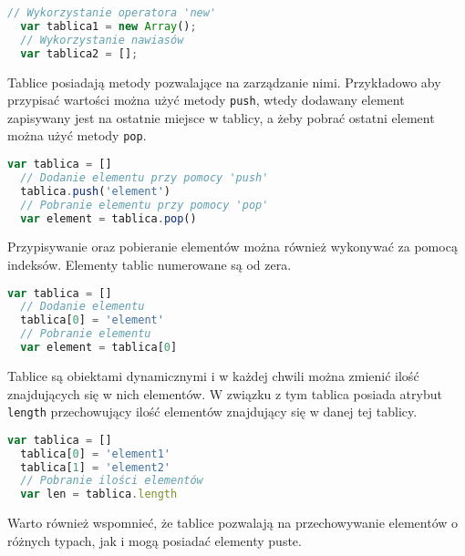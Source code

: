 \begin{lstlisting}[language=JavaScript, caption=Przykład utworzenia tablicy, label=alg:array]
  // Wykorzystanie operatora 'new'
  var tablica1 = new Array();
  // Wykorzystanie nawiasów
  var tablica2 = [];
\end{lstlisting}

\par Tablice posiadają metody pozwalające na zarządzanie nimi. Przykładowo aby przypisać wartości można użyć metody \texttt{push}, wtedy dodawany element zapisywany jest na ostatnie miejsce w tablicy, a żeby pobrać ostatni element można użyć metody \texttt{pop}.

\begin{lstlisting}[language=JavaScript, caption=Przykład zarządania elementami tablicy przy pomocy `push' i `pop', label=alg:array2]
  var tablica = []
  // Dodanie elementu przy pomocy 'push'
  tablica.push('element')
  // Pobranie elementu przy pomocy 'pop'
  var element = tablica.pop()
\end{lstlisting}

\par Przypisywanie oraz pobieranie elementów można również wykonywać za pomocą indeksów. Elementy tablic numerowane są od zera.

\begin{lstlisting}[language=JavaScript, caption=Przykład zarządania elementami tablicy przy pomocy nawiasów, label=alg:array3]
  var tablica = []
  // Dodanie elementu
  tablica[0] = 'element'
  // Pobranie elementu
  var element = tablica[0]
\end{lstlisting}

\par Tablice są obiektami dynamicznymi i w każdej chwili można zmienić ilość znajdujących się w nich elementów. W związku z tym tablica posiada atrybut \texttt{length} przechowujący ilość elementów znajdujący się w danej tej tablicy. 

\begin{lstlisting}[language=JavaScript, caption=Przykład pobrania ilości elementów tablicy , label=alg:array4]
  var tablica = []
  tablica[0] = 'element1'
  tablica[1] = 'element2'
  // Pobranie ilości elementów
  var len = tablica.length
\end{lstlisting}

\par Warto również wspomnieć, że tablice pozwalają na przechowywanie elementów o różnych typach, jak i mogą posiadać elementy puste.

